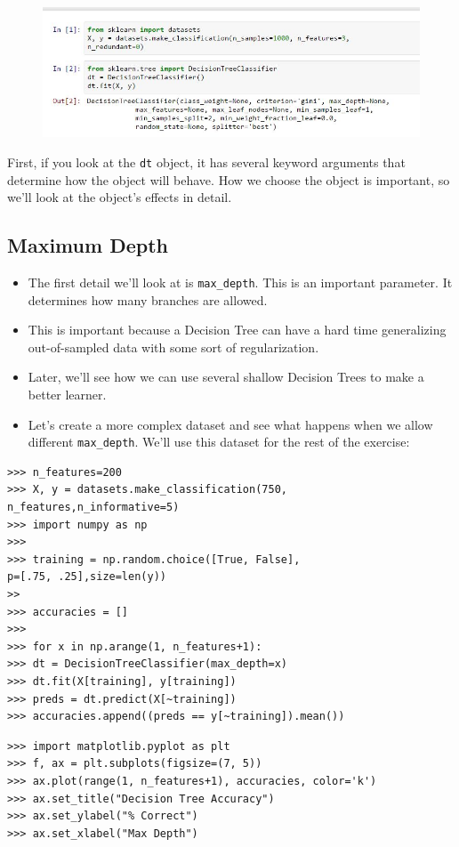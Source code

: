 \documentclass[SKL-MASTER.tex]{subfiles}
\begin{document}
\begin{figure}
\centering
\includegraphics[width=0.7\linewidth]{images/SKL41-DT1}

\end{figure}
%
First, if you look at the \texttt{dt} object, it has several keyword arguments that determine how the
object will behave. How we choose the object is important, so we'll look at the object's effects
in detail.
\subsection*{Maximum Depth}
\begin{itemize}
\item The first detail we'll look at is \texttt{max\_depth}. This is an important parameter. It determines how
many branches are allowed. 
\item This is important because a Decision Tree can have a hard time
generalizing out-of-sampled data with some sort of regularization. 
\item Later, we'll see how we
can use several shallow Decision Trees to make a better learner. 
\item Let's create a more complex
dataset and see what happens when we allow different \texttt{max\_depth}. We'll use this dataset for
the rest of the exercise:
\end{itemize}
{
	\Large
\begin{framed}
\begin{verbatim}
>>> n_features=200
>>> X, y = datasets.make_classification(750,
n_features,n_informative=5)
>>> import numpy as np
>>>
>>> training = np.random.choice([True, False], 
p=[.75, .25],size=len(y))
>>
>>> accuracies = []
>>>
>>> for x in np.arange(1, n_features+1):
>>> dt = DecisionTreeClassifier(max_depth=x)
>>> dt.fit(X[training], y[training])
>>> preds = dt.predict(X[~training])
>>> accuracies.append((preds == y[~training]).mean())
\end{verbatim}
\end{framed}
}
\begin{framed}
	\begin{verbatim}
>>> import matplotlib.pyplot as plt
>>> f, ax = plt.subplots(figsize=(7, 5))
>>> ax.plot(range(1, n_features+1), accuracies, color='k')
>>> ax.set_title("Decision Tree Accuracy")
>>> ax.set_ylabel("% Correct")
>>> ax.set_xlabel("Max Depth")
\end{verbatim}
\end{framed}
\end{document}
